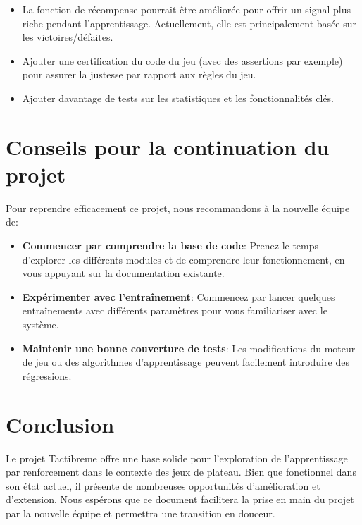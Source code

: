 \documentclass[]{article}
\begin{document}
\begin{itemize}
  \item La fonction de récompense pourrait être améliorée pour offrir un signal plus riche pendant l'apprentissage. Actuellement, elle est principalement basée sur les victoires/défaites.
  \item Ajouter une certification du code du jeu (avec des assertions par exemple) pour assurer la justesse par rapport aux règles du jeu.
  \item Ajouter davantage de tests sur les statistiques et les fonctionnalités clés.
\end{itemize}

\section{Conseils pour la continuation du projet}

Pour reprendre efficacement ce projet, nous recommandons à la nouvelle équipe de:

\begin{itemize}
  \item \textbf{Commencer par comprendre la base de code}: Prenez le temps d'explorer les différents modules et de comprendre leur fonctionnement, en vous appuyant sur la documentation existante.
  \item \textbf{Expérimenter avec l'entraînement}: Commencez par lancer quelques entraînements avec différents paramètres pour vous familiariser avec le système.
  \item \textbf{Maintenir une bonne couverture de tests}: Les modifications du moteur de jeu ou des algorithmes d'apprentissage peuvent facilement introduire des régressions.
\end{itemize}

\section{Conclusion}

Le projet Tactibreme offre une base solide pour l'exploration de l'apprentissage par renforcement dans le contexte des jeux de plateau. Bien que fonctionnel dans son état actuel, il présente de nombreuses opportunités d'amélioration et d'extension. Nous espérons que ce document facilitera la prise en main du projet par la nouvelle équipe et permettra une transition en douceur.
\end{document}
